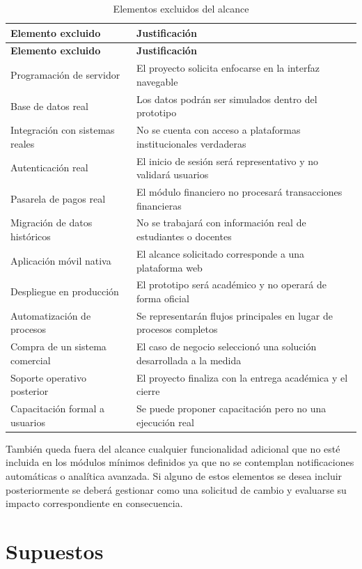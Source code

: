 \documentclass[11pt,spanish]{article}
\begin{document}
\begin{longtable}{L{5.2cm} L{9.2cm}}
\caption{Elementos excluidos del alcance}\label{tab:alcance-excluido}\\[-0.5em]
\toprule
\textbf{Elemento excluido} & \textbf{Justificación} \\
\midrule
\endfirsthead
\toprule
\textbf{Elemento excluido} & \textbf{Justificación} \\
\midrule
\endhead
Programación de servidor & El proyecto solicita enfocarse en la interfaz navegable \\
Base de datos real & Los datos podrán ser simulados dentro del prototipo \\
Integración con sistemas reales & No se cuenta con acceso a plataformas institucionales verdaderas \\
Autenticación real & El inicio de sesión será representativo y no validará usuarios \\
Pasarela de pagos real & El módulo financiero no procesará transacciones financieras \\
Migración de datos históricos & No se trabajará con información real de estudiantes o docentes \\
Aplicación móvil nativa & El alcance solicitado corresponde a una plataforma web \\
Despliegue en producción & El prototipo será académico y no operará de forma oficial \\
Automatización de procesos & Se representarán flujos principales en lugar de procesos completos \\
Compra de un sistema comercial & El caso de negocio seleccionó una solución desarrollada a la medida \\
Soporte operativo posterior & El proyecto finaliza con la entrega académica y el cierre \\
Capacitación formal a usuarios & Se puede proponer capacitación pero no una ejecución real \\
\bottomrule
\end{longtable}

También queda fuera del alcance cualquier funcionalidad adicional que no esté incluida en los módulos mínimos definidos ya que no se contemplan notificaciones automáticas o analítica avanzada. Si alguno de estos elementos se desea incluir posteriormente se deberá gestionar como una solicitud de cambio y evaluarse su impacto correspondiente en consecuencia.

\section{Supuestos}
\end{document}
